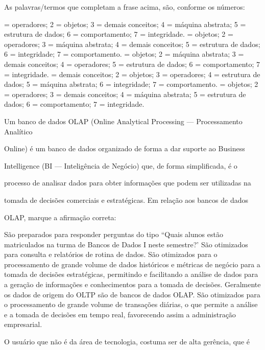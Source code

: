\documentclass[12pt, addpoints]{exam}
\begin{document}
\begin{questions}
As palavras/termos que completam a frase acima, são, conforme os números:


\begin{choices}
 = operadores; 2 = objetos; 3 = demais conceitos; 4 = máquina abstrata; 5 = estrutura de dados; 6 = comportamento; 7 = integridade.
 = objetos; 2 = operadores; 3 = máquina abstrata; 4 = demais conceitos; 5 = estrutura de dados; 6 = integridade; 7 = comportamento.
 = objetos; 2 = máquina abstrata; 3 = demais conceitos; 4 = operadores; 5 = estrutura de dados; 6 = comportamento; 7 = integridade.
 = demais conceitos; 2 = objetos; 3 = operadores; 4 = estrutura de dados; 5 = máquina abstrata; 6 = integridade; 7 = comportamento.
 = objetos; 2 = operadores; 3 = demais conceitos; 4 = máquina abstrata; 5 = estrutura de dados; 6 = comportamento; 7 = integridade.
\end{choices}

\question

Um banco de dados OLAP (Online Analytical Processing --- Processamento Analítico

Online) é um banco de dados organizado de forma a dar suporte ao Business

Intelligence (BI --- Inteligência de Negócio) que, de forma simplificada, é o

processo de analisar dados para obter informações que podem ser utilizadas na

tomada de decisões comerciais e estratégicas. Em relação aos bancos de dados

OLAP, marque a afirmação correta:
\begin{choices}
\choice São preparados para responder perguntas do tipo ``Quais alunos estão matriculados na turma de Bancos de Dados I neste semestre?'
\choice São otimizados para consulta e relatórios de rotina de dados.
\choice São otimizados para o processamento de grande volume de dados históricos e métricas de negócio para a tomada de decisões estratégicas, permitindo e facilitando a análise de dados para a geração de informações e conhecimentos para a tomada de decisões.
\choice Geralmente os dados de origem do OLTP são de bancos de dados OLAP.
\choice São otimizados para o processamento de grande volume de transações diárias, o que permite a análise e a tomada de decisões em tempo real, favorecendo assim a administração empresarial.
\end{choices}

\question

O usuário que não é da área de tecnologia, costuma ser de alta gerência, que é


\end{questions}
\end{document}
